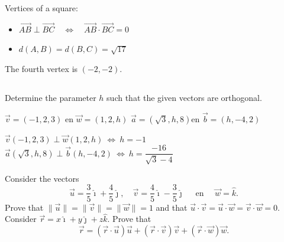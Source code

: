\begin{Answer}\phantom{}
    Vertices of a square:
	\begin{itemize}
	\item $\overrightarrow{AB} \perp \overrightarrow{BC} \quad \Leftrightarrow \quad \overrightarrow{AB} \cdot \overrightarrow{BC} = 0$
	\item $d(A,B) = d(B,C) = \sqrt{17}$
	\end{itemize}
	The fourth vertex is $(-2,-2)$.
\end{Answer}


\ifanalysis \subsection*{} \fi
\ifcalculus \subsection*{} \fi
\begin{Exercise} Determine the parameter $h$ such that the given vectors are orthogonal. 
	\begin{multicols}{2}
		\Question[difficulty = 1] $ \vec{v}=(-1, 2, 3)$ \quad en \quad $  \vec{w}=(1,2, h) $
		\Question[difficulty = 1] $  \vec{a}=(\sqrt{3}, h, 8) $\quad en \quad $\vec{b}=(h,-4,2)  $
		\EndCurrentQuestion
	\end{multicols}
	
\end{Exercise}

\begin{Answer}\phantom{}
    
		\Question $ \vec{v}(-1, 2, 3) \perp \vec{w}(1,2, h) \ \Leftrightarrow \ h=-1$
		\Question  $  \vec{a}(\sqrt{3}, h, 8) \perp \vec{b}(h,-4,2) \ \Leftrightarrow \ h=\dfrac{-16}{\sqrt{3}-4} $
	
\end{Answer}


	
\ifanalysis
    \begin{Exercise} Consider the vectors 
    \[ \vec{u}=\dfrac{3}{5} \hat{\imath} + \dfrac{4}{5} \hat{\jmath}, \quad \vec{v}=\dfrac{4}{5} \hat{\imath} - \dfrac{3}{5} \hat{\jmath} \quad \text{ en } \quad \vec{w}=\hat{k}. \]
	\Question[difficulty = 1] Prove that $\|\vec{u}\| = \|\vec{v}\| = \|\vec{w}\| = 1 $ and that $\vec{u} \cdot \vec{v} = \vec{u} \cdot \vec{w}  = \vec{v} \cdot \vec{w} = 0$.
	\Question[difficulty = 1] Consider $\vec{r}= x \hat{\imath} + y \hat{\jmath}  + z \hat{k}$. Prove that
	\[ \vec{r} = (\vec{r} \cdot \vec{u}) \vec{u} + (\vec{r} \cdot \vec{v}) \vec{v} + (\vec{r} \cdot \vec{w}) \vec{w}. \]

\end{Exercise}

